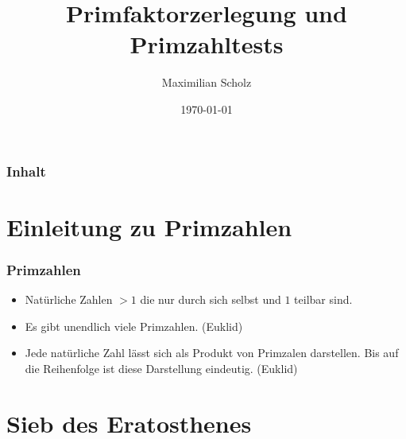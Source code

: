 \documentclass[mathserif, compress]{beamer}
\title{Primfaktorzerlegung und Primzahltests}    %
\author{Maximilian Scholz}                 %
\institute{Proseminar Mathematik}      %
\date{\today}                    %
\begin{document}
\begin{frame}
  \titlepage
\end{frame}

\section[]{}

\begin{frame}
  \frametitle{Inhalt}
  \tableofcontents
\end{frame}

\section{Einleitung zu Primzahlen}
  
\begin{frame}
  \frametitle{Primzahlen}
  \begin{itemize}
    \item Nat\"urliche Zahlen $> 1$ die nur durch sich selbst und $1$ teilbar sind.
      \vspace{3mm}
    \item Es gibt unendlich viele Primzahlen. (Euklid)
      \vspace{3mm}
    \item Jede nat\"urliche Zahl l\"asst sich als Produkt von Primzalen darstellen. 
	  Bis auf die Reihenfolge ist diese Darstellung eindeutig. (Euklid)
  \end{itemize}
\end{frame}

\section{Sieb des Eratosthenes}
\end{document}
